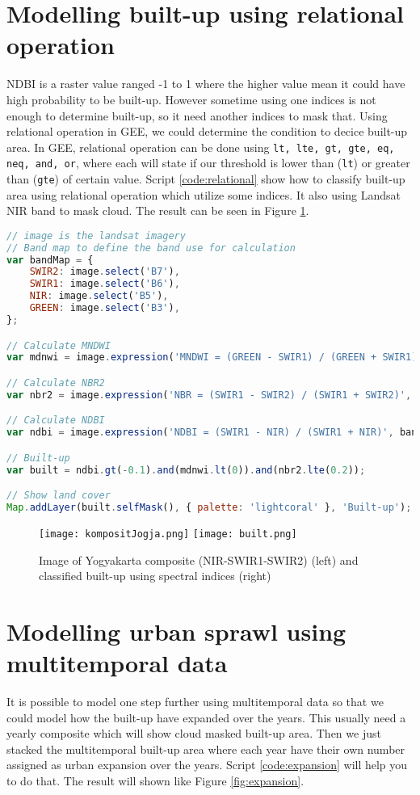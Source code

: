 \section{Modelling built-up using relational operation}
NDBI is a raster value ranged -1 to 1 where the higher value mean it could have high probability to be built-up. However sometime using one indices is not enough to determine built-up, so it need another indices to mask that. Using relational operation in GEE, we could determine the condition to decice built-up area. In GEE, relational operation can be done using \verb|lt, lte, gt, gte, eq, neq, and, or|, where each will state if our threshold is lower than (\verb|lt|) or greater than (\verb|gte|) of certain value. Script \ref{code:relational} show how to classify built-up area using relational operation which utilize some indices. It also using Landsat NIR band to mask cloud. The result can be seen in Figure \ref{fig:built}.

\begin{lstlisting}[language=JavaScript, label={code:relational}, caption={GEE Script to Classify Built-up using Relational Operation}]
// image is the landsat imagery
// Band map to define the band use for calculation
var bandMap = {
	SWIR2: image.select('B7'),
	SWIR1: image.select('B6'),
	NIR: image.select('B5'),
	GREEN: image.select('B3'),
};

// Calculate MNDWI
var mdnwi = image.expression('MNDWI = (GREEN - SWIR1) / (GREEN + SWIR1)', bandMap);

// Calculate NBR2
var nbr2 = image.expression('NBR = (SWIR1 - SWIR2) / (SWIR1 + SWIR2)', bandMap);

// Calculate NDBI
var ndbi = image.expression('NDBI = (SWIR1 - NIR) / (SWIR1 + NIR)', bandMap);

// Built-up
var built = ndbi.gt(-0.1).and(mdnwi.lt(0)).and(nbr2.lte(0.2));

// Show land cover
Map.addLayer(built.selfMask(), { palette: 'lightcoral' }, 'Built-up');
\end{lstlisting}

\begin{figure}[htbp]
	\centering
	\label{fig:built}
	\texttt{[image: kompositJogja.png]}
	\texttt{[image: built.png]}
	\caption{Image of Yogyakarta composite (NIR-SWIR1-SWIR2) (left) and classified built-up using spectral indices (right)}
\end{figure}

\section{Modelling urban sprawl using multitemporal data}
It is possible to model one step further using multitemporal data so that we could model how the built-up have expanded over the years. This usually need a yearly composite which will show cloud masked built-up area. Then we just stacked the multitemporal built-up area where each year have their own number assigned as urban expansion over the years. Script \ref{code:expansion} will help you to do that. The result will shown like Figure \ref{fig:expansion}.

